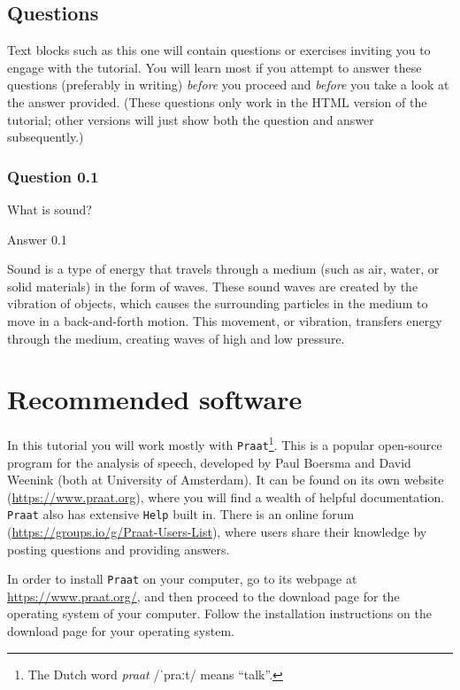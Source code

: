 \documentclass[
]{book}
\begin{document}
\label{question-intro}
\subsection*{Questions}\label{questions}

Text blocks such as this one will contain questions or exercises inviting you to engage with the tutorial. You will learn most if you attempt to answer these questions (preferably in writing) \emph{before} you proceed and \emph{before} you take a look at the answer provided. (These questions only work in the HTML version of the tutorial; other versions will just show both the question and answer subsequently.)

\subsubsection*{Question 0.1}\label{question-0.1}

What is sound?

Answer 0.1

Sound is a type of energy that travels through a medium (such as air, water, or solid materials) in the form of waves. These sound waves are created by the vibration of objects, which causes the surrounding particles in the medium to move in a back-and-forth motion. This movement, or vibration, transfers energy through the medium, creating waves of high and low pressure.

\section*{Recommended software}\label{recommended-software}

In this tutorial you will work mostly with \texttt{Praat}\footnote{The Dutch word \emph{praat} /ˈpraːt/ means ``talk''.}. This is a popular open-source program for the analysis of speech, developed by Paul Boersma and David Weenink (both at University of Amsterdam). It can be found on its own website (\url{https://www.praat.org}), where you will find a wealth of helpful documentation. \texttt{Praat} also has extensive \texttt{Help} built in.
There is an online forum (\url{https://groups.io/g/Praat-Users-List}), where users share their knowledge by posting questions and providing answers.

In order to install \texttt{Praat} on your computer, go to its webpage at \url{https://www.praat.org/}, and then proceed to the download page for the operating system of your computer. Follow the installation instructions on the download page for your operating system.
\end{document}
